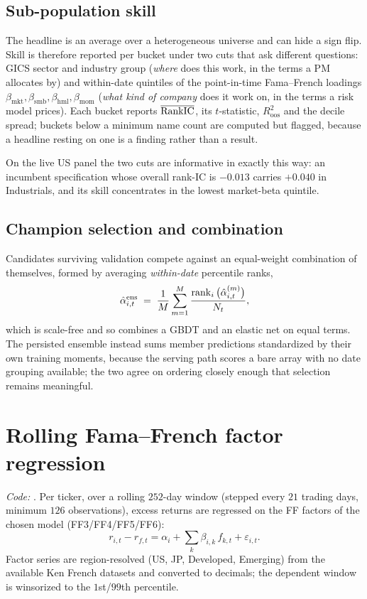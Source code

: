 \documentclass[11pt]{article}
\begin{document}
\subsection{Sub-population skill}
The headline is an average over a heterogeneous universe and can hide a sign flip.
Skill is therefore reported per bucket under two cuts that ask different questions:
GICS sector and industry group (\emph{where} does this work, in the terms a PM
allocates by) and within-date quintiles of the point-in-time Fama--French loadings
$\beta_{\text{mkt}},\beta_{\text{smb}},\beta_{\text{hml}},\beta_{\text{mom}}$
(\emph{what kind of company} does it work on, in the terms a risk model prices). Each
bucket reports $\overline{\mathrm{RankIC}}$, its $t$-statistic, $R^2_{\text{oos}}$ and the
decile spread; buckets below a minimum name count are computed but flagged, because a
headline resting on one is a finding rather than a result.

On the live US panel the two cuts are informative in exactly this way: an incumbent
specification whose overall rank-IC is $-0.013$ carries $+0.040$ in Industrials, and
its skill concentrates in the lowest market-beta quintile.

\subsection{Champion selection and combination}
Candidates surviving validation compete against an equal-weight combination of
themselves, formed by averaging \emph{within-date} percentile ranks,
\begin{equation}
  \hat\alpha^{\text{ens}}_{i,t}
  \;=\; \frac1M\sum_{m=1}^{M}\frac{\operatorname{rank}_i\big(\hat\alpha^{(m)}_{i,t}\big)}{N_t},
\end{equation}
which is scale-free and so combines a GBDT and an elastic net on equal terms. The
persisted ensemble instead sums member predictions standardized by their own training
moments, because the serving path scores a bare array with no date grouping available;
the two agree on ordering closely enough that selection remains meaningful.

\section{Rolling Fama--French factor regression}
\label{sec:ffreg}
\emph{Code:} . Per ticker, over a
rolling $252$-day window (stepped every $21$ trading days, minimum $126$
observations), excess returns are regressed on the FF factors of the chosen model
(FF3/FF4/FF5/FF6):
\begin{equation}
  r_{i,t}-r_{f,t}=\alpha_i+\sum_k\beta_{i,k}\,f_{k,t}+\varepsilon_{i,t}.
\end{equation}
Factor series are region-resolved (US, JP, Developed, Emerging) from the available
Ken French datasets and converted to decimals; the dependent window is winsorized
to the $1$st/$99$th percentile.
\end{document}
